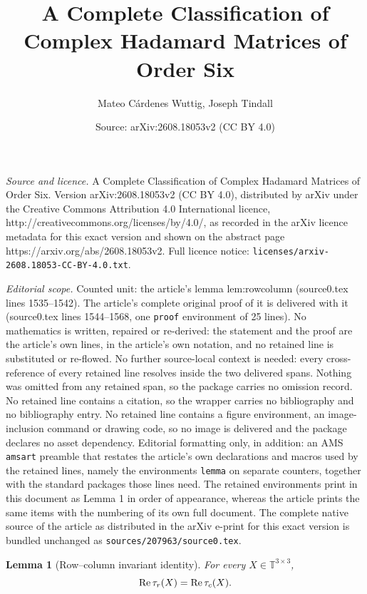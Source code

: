 \documentclass[10pt,a4paper]{amsart}
\title{A Complete Classification of Complex Hadamard Matrices of Order Six}
\author{Mateo C\'ardenes Wuttig, Joseph Tindall}
\date{Source: arXiv:2608.18053v2 (CC BY 4.0)}
\newtheorem{lemma}{Lemma}
\newcommand{\RePart}{\operatorname{Re}}
\newcommand{\T}{\mathbb T}
\begin{document}
\maketitle

\noindent\emph{Source and licence.} A Complete Classification of Complex Hadamard Matrices of Order Six. Version arXiv:2608.18053v2 (CC BY 4.0), distributed by arXiv under the Creative Commons Attribution 4.0 International licence, http://creativecommons.org/licenses/by/4.0/, as recorded in the arXiv licence metadata for this exact version and shown on the abstract page https://arxiv.org/abs/2608.18053v2. Full licence notice: \texttt{licenses/arxiv-2608.18053-CC-BY-4.0.txt}.\par\smallskip

\noindent\textit{Editorial scope.} Counted unit: the article's lemma lem:rowcolumn (source0.tex lines 1535--1542). The article's complete original proof of it is delivered with it (source0.tex lines 1544--1568, one \texttt{proof} environment of 25 lines). No mathematics is written, repaired or re-derived: the statement and the proof are the article's own lines, in the article's own notation, and no retained line is substituted or re-flowed.  No further source-local context is needed: every cross-reference of every retained line resolves inside the two delivered spans.  Nothing was omitted from any retained span, so the package carries no omission record.  No retained line contains a citation, so the wrapper carries no bibliography and no bibliography entry.  No retained line contains a figure environment, an image-inclusion command or drawing code, so no image is delivered and the package declares no asset dependency.  Editorial formatting only, in addition: an AMS \texttt{amsart} preamble that restates the article's own declarations and macros used by the retained lines, namely the environments \texttt{lemma} on separate counters, together with the standard packages those lines need.  The retained environments print in this document as Lemma 1 in order of appearance, whereas the article prints the same items with the numbering of its own full document.  The complete native source of the article as distributed in the arXiv e-print for this exact version is bundled unchanged as \texttt{sources/207963/source0.tex}.
\begin{lemma}[Row--column invariant identity]
\label{lem:rowcolumn}
For every $X\in\T^{3\times3}$,
\begin{equation}
\RePart\tau_{\rm r}(X)=\RePart\tau_{\rm c}(X).
\label{eq:rowcolidentity}
\end{equation}
\end{lemma}
\end{document}
